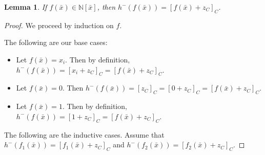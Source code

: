 \documentclass{msthesis}
\newtheorem{lemma}[theorem]{Lemma}
\theoremstyle{definition}
\newcommand{\nat}{\mathbb{N}}
\begin{document}
\begin{lemma}\label{lemma:h-z_C}
    If $f(\bar{x}) \in \nat[\bar{x}]$, then $h^-(f(\bar{x})) = [f(\bar{x}) + z_C]_C$.
\end{lemma}
\begin{proof}
    We proceed by induction on $f$.

    The following are our base cases:

    \begin{itemize}[nosep]
        \item Let $f(\bar{x}) = x_i$.  Then by definition, $h^-(f(\bar{x})) = [x_i + z_C]_C = [f(\bar{x}) + z_C]_C$.
        \item Let $f(\bar{x}) = 0$. Then $h^-(f(\bar{x})) = [z_C]_C = [0 + z_C]_C = [f(\bar{x}) + z_C]_C$.
        \item Let $f(\bar{x}) = 1$. Then by definition, $h^-(f(\bar{x})) = [1 + z_C]_C = [f(\bar{x}) + z_C]_C$.
    \end{itemize}

    The following are the inductive cases.  Assume that $h^-(f_1(\bar{x})) = [f_1(\bar{x}) + z_C]_C$ and $h^-(f_2(\bar{x})) = [f_2(\bar{x}) + z_C]_C$.  


\end{proof}
\end{document}
